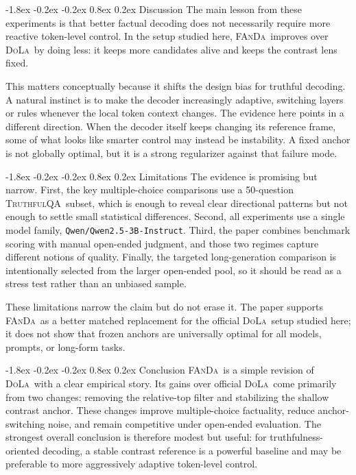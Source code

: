 \documentclass[10pt,twocolumn]{article}
\makeatletter
\newcommand{\fanda}{\textsc{FAnDa}}
\newcommand{\dola}{\textsc{DoLa}}
\newcommand{\truthfulqa}{\textsc{TruthfulQA}}
\renewcommand\section{\@startsection{section}{1}{\z@}%
  {-1.8ex \@plus -0.2ex \@minus -0.2ex}%
  {0.8ex \@plus 0.2ex}%
  {\large\bfseries}}
\makeatother
\begin{document}
\section{Discussion}
The main lesson from these experiments is that better factual decoding does not necessarily require more reactive token-level control. In the setup studied here, \fanda\ improves over \dola\ by doing less: it keeps more candidates alive and keeps the contrast lens fixed.

This matters conceptually because it shifts the design bias for truthful decoding. A natural instinct is to make the decoder increasingly adaptive, switching layers or rules whenever the local token context changes. The evidence here points in a different direction. When the decoder itself keeps changing its reference frame, some of what looks like smarter control may instead be instability. A fixed anchor is not globally optimal, but it is a strong regularizer against that failure mode.

\section{Limitations}
The evidence is promising but narrow. First, the key multiple-choice comparisons use a 50-question \truthfulqa\ subset, which is enough to reveal clear directional patterns but not enough to settle small statistical differences. Second, all experiments use a single model family, \texttt{Qwen/Qwen2.5-3B-Instruct}. Third, the paper combines benchmark scoring with manual open-ended judgment, and those two regimes capture different notions of quality. Finally, the targeted long-generation comparison is intentionally selected from the larger open-ended pool, so it should be read as a stress test rather than an unbiased sample.

These limitations narrow the claim but do not erase it. The paper supports \fanda\ as a better matched replacement for the official \dola\ setup studied here; it does not show that frozen anchors are universally optimal for all models, prompts, or long-form tasks.

\section{Conclusion}
\fanda\ is a simple revision of \dola\ with a clear empirical story. Its gains over official \dola\ come primarily from two changes: removing the relative-top filter and stabilizing the shallow contrast anchor. These changes improve multiple-choice factuality, reduce anchor-switching noise, and remain competitive under open-ended evaluation. The strongest overall conclusion is therefore modest but useful: for truthfulness-oriented decoding, a stable contrast reference is a powerful baseline and may be preferable to more aggressively adaptive token-level control.
\end{document}
